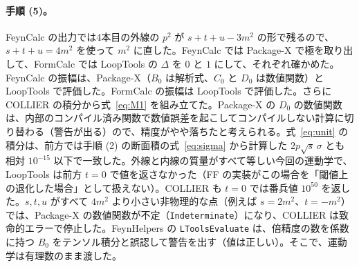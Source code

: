 \documentclass[a4paper,10pt]{ltjsarticle}
\begin{document}
\paragraph{手順 (5)。}FeynCalc の出力では4本目の外線の $p^2$ が $s+t+u-3m^2$ の形で残るので、$s+t+u=4m^2$ を使って $m^2$ に直した。FeynCalc では Package-X で極を取り出して、FormCalc では LoopTools の $\Delta$ を $0$ と $1$ にして、それぞれ確かめた。FeynCalc の振幅は、Package-X（$B_0$ は解析式、$C_0$ と $D_0$ は数値関数）と LoopTools で評価した。FormCalc の振幅は LoopTools で評価した。さらに COLLIER の積分から式~\eqref{eq:M1} を組み立てた。Package-X の $D_0$ の数値関数は、内部のコンパイル済み関数で数値誤差を起こしてコンパイルしない計算に切り替わる（警告が出る）ので、精度がやや落ちたと考えられる。式~\eqref{eq:unit} の積分は、前方では手順 (2) の断面積の式~\eqref{eq:sigma} から計算した $2p\sqrt s\,\sigma$ とも相対 $10^{-15}$ 以下で一致した。外線と内線の質量がすべて等しい今回の運動学で、LoopTools は前方 $t=0$ で値を返さなかった（FF の実装がこの場合を「閾値上の退化した場合」として扱えない）。COLLIER も $t=0$ では番兵値 $10^{50}$ を返した。$s,t,u$ がすべて $4m^2$ より小さい非物理的な点（例えば $s=2m^2$、$t=-m^2$）では、Package-X の数値関数が不定（\texttt{Indeterminate}）になり、COLLIER は致命的エラーで停止した。FeynHelpers の \texttt{LToolsEvaluate} は、倍精度の数を係数に持つ $B_0$ をテンソル積分と誤認して警告を出す（値は正しい）。そこで、運動学は有理数のまま渡した。
\end{document}
